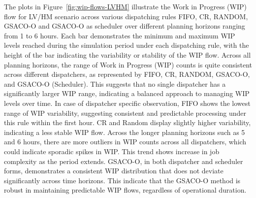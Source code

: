 The plots in Figure~\ref{fig:wip-flows-LVHM} illustrate the Work in Progress (WIP) flow for LV/HM scenario across various dispatching rules FIFO, CR, RANDOM, GSACO-O and GSACO-O as scheduler over different planning horizons ranging from 1 to 6 hours. Each bar demonstrates the minimum and maximum WIP levels reached during the simulation period under each dispatching rule, with the height of the bar indicating the variability or stability of the WIP flow. 
Across all planning horizons, the range of Work in Progress (WIP) counts is quite consistent across different dispatchers, as represented by FIFO, CR, RANDOM, GSACO-O, and GSACO-O (Scheduler). This suggests that no single dispatcher has a significantly larger WIP range, indicating a balanced approach to managing WIP levels over time.
In case of dispatcher specific observation, FIFO shows the lowest range of WIP variability, suggesting consistent and predictable processing under this rule within the first hour. CR and Random display slightly higher variability, indicating a less stable WIP flow.
Across the longer planning horizons such as 5 and 6 hours, there are more outliers in WIP counts across all dispatchers, which could indicate sporadic spikes in WIP. This trend shows increase in job complexity as the period extends. 
GSACO-O, in both dispatcher and scheduler forms, demonstrates a consistent WIP distribution that does not deviate significantly across time horizons. This indicate that the GSACO-O method is robust in maintaining predictable WIP flows, regardless of operational duration.


